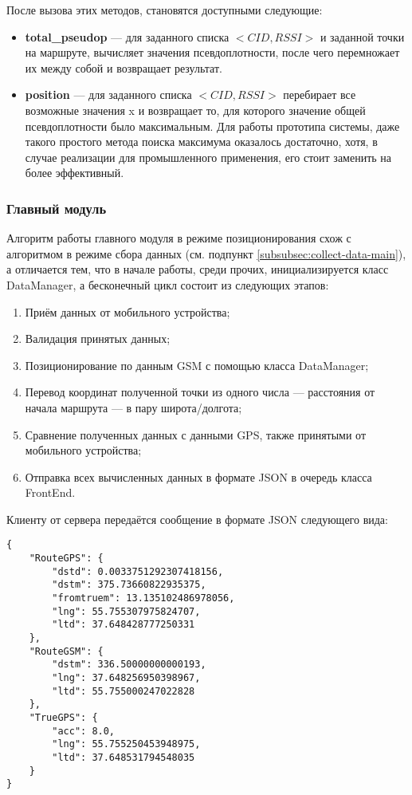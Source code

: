 После вызова этих методов, становятся доступными следующие:
\begin{itemize}
	\item
		{\bf{}total\_pseudop} --- для заданного списка $<CID, RSSI>$ и заданной точки на маршруте, вычисляет значения псевдоплотности, после чего перемножает их между собой и возвращает результат.
	\item
		{\bf{}position} --- для заданного списка $<CID, RSSI>$ перебирает все возможные значения x и возвращает то, для которого значение общей псевдоплотности было максимальным. Для работы прототипа системы, даже такого простого метода поиска максимума оказалось достаточно, хотя, в случае реализации для промышленного применения, его стоит заменить на более эффективный.
\end{itemize}

\subsubsection{Главный модуль}
\label{subsubsec:server-perform-main}
Алгоритм работы главного модуля в режиме позиционирования схож с алгоритмом в режиме сбора данных (см. подпункт \ref{subsubsec:collect-data-main}), а отличается тем, что в начале работы, среди прочих, инициализируется класс DataManager, а бесконечный цикл состоит из следующих этапов:

\begin{enumerate}
	\item
		Приём данных от мобильного устройства;
	\item
		Валидация принятых данных;
	\item
		Позиционирование по данным GSM с помощью класса DataManager;
	\item
		Перевод координат полученной точки из одного числа --- расстояния от начала маршрута --- в пару широта/долгота;
	\item
		Сравнение полученных данных с данными GPS, также принятыми от мобильного устройства;
	\item
		Отправка всех вычисленных данных в формате JSON в очередь класса FrontEnd.
\end{enumerate}

Клиенту от сервера передаётся сообщение в формате JSON следующего вида:
\begin{lstlisting}
{
    "RouteGPS": {
        "dstd": 0.0033751292307418156, 
        "dstm": 375.73660822935375, 
        "fromtruem": 13.135102486978056, 
        "lng": 55.755307975824707, 
        "ltd": 37.648428777250331
    }, 
    "RouteGSM": {
        "dstm": 336.50000000000193, 
        "lng": 37.648256950398967, 
        "ltd": 55.755000247022828
    }, 
    "TrueGPS": {
        "acc": 8.0, 
        "lng": 55.755250453948975, 
        "ltd": 37.648531794548035
    }
}
\end{lstlisting}

